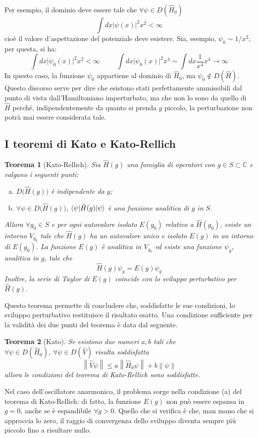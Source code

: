 \documentclass[10pt, a4paper]{scrartcl} %
\numberwithin{equation}{section}
\theoremstyle{style2}
\theoremstyle{style1}
\newtheorem{teorema}{Teorema}[section]
\begin{document}
Per esempio, il dominio deve essere tale che $\forall \psi \in D(\hat{H}_0)$
\[
\int dx \lvert \psi (x) \rvert ^2 x^2 < \infty
\] 
cio\`e il valore d'aspettazione del potenziale deve esistere.
Sia, esempio, $\psi _0\sim 1 / x^2$; per questa, si ha:
\[
\int dx \lvert \psi _0(x) \rvert ^2 x^2 < \infty \hspace{1cm} \int dx \lvert \psi _0(x) \rvert ^2 x^4 \sim \int dx \frac{1}{x^4} x^4 \to \infty
\] 
In questo caso, la funzione $\psi _0$ appartiene al dominio di $\hat{H}_0$, ma $\psi _0 \not \in D(\hat{H})$.
Questo discorso serve per dire che esistono stati perfettamente ammissibili dal punto di vista dall'Hamiltoniano imperturbato, ma che non lo sono da quello di $\hat{H}$ perch\'e, indipendentemente da quanto si prenda $g$ piccolo, la perturbazione non potr\`a mai essere considerata tale.
\subsection{I teoremi di Kato e Kato-Rellich}
\begin{teorema}
	[Kato-Rellich]
Sia $\hat{H} (g) $ una famiglia di operatori con $g \in S \subset  \mathbb{C}$ e valgano i seguenti punti:
\begin{enumerate}[(a).]
	\item $D\big(\hat{H}(g)\big)$ \`e indipendente da $g$;
	\item $\forall \psi  \in D\big(\hat{H}(g)\big)$, $\braket{\psi |\hat{H}(g)|\psi } $ \`e una funzione analitica di $g$ in $S$.
\end{enumerate}
Allora $\forall g_0 \in S$ e per ogni autovalore isolato $E(g_0)$ relativo a $\hat{H}(g_0)$, esiste un intorno $V_{g_0} $ tale che $\hat{H}(g)$ ha un autovalore unico e isolato $E(g)$ in un intorno di $E(g_0)$.
La funzione $E(g)$ \`e analitica in $V_{g_0} $ ed esiste una funzione $\psi _g$, analitica in $g$, tale che
\[
\hat{H}(g) \psi _g = E(g) \psi _g
\] 
Inoltre, la serie di Taylor di $E(g)$ coincide con lo sviluppo perturbativo per $\hat{H}(g)$.
\end{teorema}
Questo teorema permette di concludere che, soddisfatte le sue condizioni, lo sviluppo perturbativo restituisce il risultato esatto.
Una condizione sufficiente per la validit\`a dei due punti del teorema \`e data dal seguente.
\begin{teorema}
	[Kato]
	Se esistono due numeri $a,b$ tali che $\forall \psi \in D(\hat{H}_0), \ \forall \psi \in D(\hat{V})$ risulta soddisfatta 
	\begin{equation}
		\left\lVert \hat{V}\psi  \right\rVert \le a \left\lVert \hat{H}_0 \psi  \right\rVert + b \left\lVert \psi  \right\rVert 
	\end{equation}
	allora le condizioni del teorema di Kato-Rellich sono soddisfatte.
\end{teorema}
Nel caso dell'oscillatore anarmonico, il problema sorge nella condizione (a) del teorema di Kato-Rellich: di fatto, la funzione $E(g)$ non pu\`o essere espansa in $g=0$, anche se \`e espandibile $\forall g > 0$.
Quello che si verifica \`e che, man mano che si approccia lo zero, il raggio di convergenza dello sviluppo diventa sempre pi\`u piccolo fino a risultare nullo.
\end{document}
